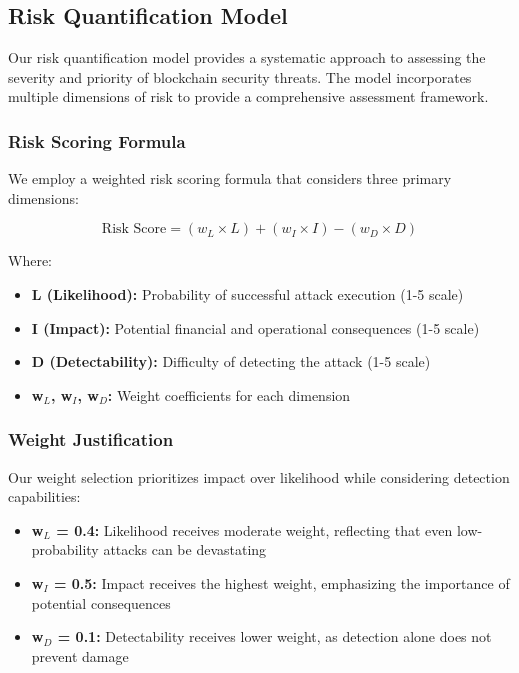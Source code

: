 \subsection{Risk Quantification Model}
\label{sec:risk_quantification}

Our risk quantification model provides a systematic approach to assessing the severity and priority of blockchain security threats. The model incorporates multiple dimensions of risk to provide a comprehensive assessment framework.

\subsubsection{Risk Scoring Formula}
We employ a weighted risk scoring formula that considers three primary dimensions:

\begin{equation}
    \text{Risk Score} = (w_L \times L) + (w_I \times I) - (w_D \times D)
\end{equation}

Where:
\begin{itemize}
    \item \textbf{L (Likelihood):} Probability of successful attack execution (1-5 scale)
    \item \textbf{I (Impact):} Potential financial and operational consequences (1-5 scale)
    \item \textbf{D (Detectability):} Difficulty of detecting the attack (1-5 scale)
    \item \textbf{w$_L$, w$_I$, w$_D$:} Weight coefficients for each dimension
\end{itemize}

\subsubsection{Weight Justification}
Our weight selection prioritizes impact over likelihood while considering detection capabilities:

\begin{itemize}
    \item \textbf{w$_L$ = 0.4:} Likelihood receives moderate weight, reflecting that even low-probability attacks can be devastating
    \item \textbf{w$_I$ = 0.5:} Impact receives the highest weight, emphasizing the importance of potential consequences
    \item \textbf{w$_D$ = 0.1:} Detectability receives lower weight, as detection alone does not prevent damage
\end{itemize}

